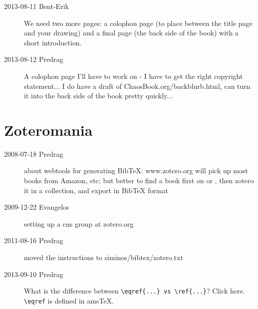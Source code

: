 \begin{description}
\item[2013-08-11 Bent-Erik]
We need two more pages: a
{colophon page} (to place between the title page and your drawing) and a
final page (the back side of the book) with a short introduction.

\item[2013-08-12 Predrag] A colophon page I'll have to work on - I have
to get the right copyright statement... I do have a draft of
 {ChaosBook.org/backblurb.html},
can turn it into the back side of the book pretty quickly...

\end{description}



\section{Zoteromania}

\begin{description}

\item[2008-07-18 Predrag] about webtools for generating BibTeX:
www.zotero.org
        will pick up most books from Amazon, etc; but
        better to find a book first on
          or
, then zotero it
          in a collection, and export in BibTeX format

\item[2009-12-22 Evangelos]
setting up a cns group at zotero.org

\item[2011-08-16 Predrag] moved the instructions to siminos/bibtex/zotero.txt

\item[2013-09-10 Predrag]
What is the difference between \verb+\eqref{...} vs \ref{...}+?
{Click here}. \verb+\eqref+ is defined in amsTeX.

\end{description}
